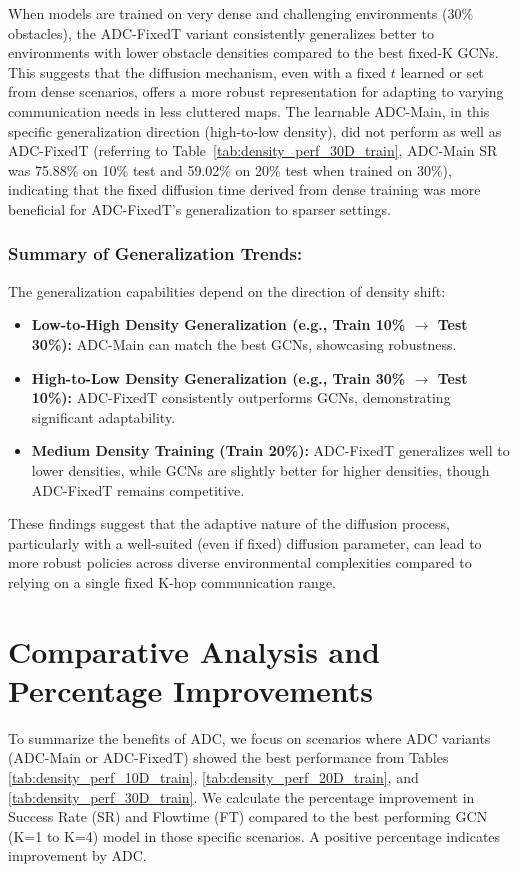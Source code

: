 When models are trained on very dense and challenging environments (30\% obstacles), the ADC-FixedT variant consistently generalizes better to environments with lower obstacle densities compared to the best fixed-K GCNs. This suggests that the diffusion mechanism, even with a fixed $t$ learned or set from dense scenarios, offers a more robust representation for adapting to varying communication needs in less cluttered maps. The learnable ADC-Main, in this specific generalization direction (high-to-low density), did not perform as well as ADC-FixedT (referring to Table~\ref{tab:density_perf_30D_train}, ADC-Main SR was 75.88\% on 10\% test and 59.02\% on 20\% test when trained on 30\%), indicating that the fixed diffusion time derived from dense training was more beneficial for ADC-FixedT's generalization to sparser settings.

\subsubsection{Summary of Generalization Trends:}
The generalization capabilities depend on the direction of density shift:
\begin{itemize}
    \item \textbf{Low-to-High Density Generalization (e.g., Train 10\% $\rightarrow$ Test 30\%):} ADC-Main can match the best GCNs, showcasing robustness.
    \item \textbf{High-to-Low Density Generalization (e.g., Train 30\% $\rightarrow$ Test 10\%):} ADC-FixedT consistently outperforms GCNs, demonstrating significant adaptability.
    \item \textbf{Medium Density Training (Train 20\%):} ADC-FixedT generalizes well to lower densities, while GCNs are slightly better for higher densities, though ADC-FixedT remains competitive.
\end{itemize}
These findings suggest that the adaptive nature of the diffusion process, particularly with a well-suited (even if fixed) diffusion parameter, can lead to more robust policies across diverse environmental complexities compared to relying on a single fixed K-hop communication range.
\section{Comparative Analysis and Percentage Improvements}
\label{sec:comparative_analysis}
To summarize the benefits of ADC, we focus on scenarios where ADC variants (ADC-Main or ADC-FixedT) showed the best performance from Tables \ref{tab:density_perf_10D_train}, \ref{tab:density_perf_20D_train}, and \ref{tab:density_perf_30D_train}. We calculate the percentage improvement in Success Rate (SR) and Flowtime (FT) compared to the best performing GCN (K=1 to K=4) model in those specific scenarios. A positive percentage indicates improvement by ADC.

